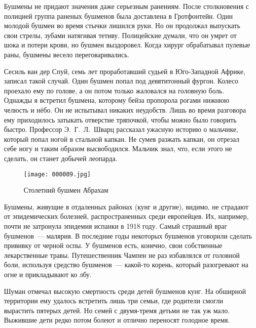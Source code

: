 \documentclass[12pt,a4paper,twoside,openany,svgnames]{memoir}
\begin{document}
Бушмены не придают значения даже серьезным ранениям. После столкновения с полицией группа раненых бушменов была доставлена в Гротфонтейн. Один молодой бушмен во время стычки лишился руки. Но он продолжал выпускать свои стрелы, зубами натягивая тетиву. Полицейские думали, что он умрет от шока и потери крови, но бушмен выздоровел. Когда хирург обрабатывал пулевые раны, бушмены весело переговаривались.

Сесиль ван дер Спуй, семь лет проработавший судьей в Юго-Западной Африке, записал такой случай. Один бушмен попал под девятитонный фургон. Колесо проехало ему по голове, а он потом только жаловался на головную боль. Однажды я встретил бушмена, которому бейза пропорола рогами нижнюю челюсть и нёбо. Он не испытывал никаких неудобств. Лишь во время разговора ему приходилось затыкать отверстие тряпочкой, чтобы можно было говорить быстро. Профессор Э.~Г.~Л.~Шварц рассказал ужасную историю о мальчике, который попал ногой в стальной капкан. Не сумев разжать капкан, он отрезал себе ногу и таким образом высвободился. Мальчик знал, что, если этого не сделать, он станет добычей леопарда.

\begin{figure}[ht!]
\centering
\texttt{[image: 000009.jpg]}
\caption{Столетний бушмен Абрахам}
\label{overflow}
\end{figure}



Бушмены, живущие в отдаленных районах (кунг и другие), видимо, не страдают от эпидемических болезней, распространенных среди европейцев. Их, например, почти не затронула эпидемия испанки в 1918 году. Самый страшный враг бушменов~--- малярия. В последние годы некоторых бушменов уговорили сделать прививку от черной оспы. У бушменов есть, конечно, свои собственные лекарственные травы. Путешественник Чампен не раз избавлялся от головной боли, используя средство бушменов~--- какой-то корень, который разогревают на огне и прикладывают ко лбу.

Шуман отмечал высокую смертность среди детей бушменов кунг. На обширной территории ему удалось встретить лишь три семьи, где родители смогли вырастить пятерых детей. Но семей с двумя-тремя детьми не так уж мало. Выжившие дети редко потом болеют и отлично переносят голодное время.
\end{document}
